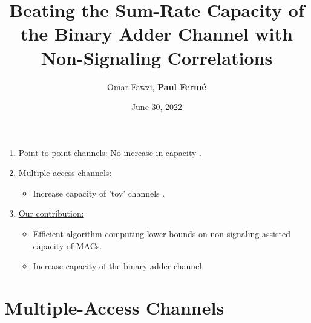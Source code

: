 \documentclass{beamer}
\title{Beating the Sum-Rate Capacity of the Binary Adder Channel with Non-Signaling Correlations}
\author{Omar Fawzi, \textbf{Paul Fermé}}
\institute{\href{https://arxiv.org/abs/2206.10968}{arXiv:2206.10968}}
\date{June 30, 2022}
\theoremstyle{definition}
\theoremstyle{remark}
\begin{document}

\begin{frame}
  \titlepage
\end{frame}

\begin{frame}
  \pause
  \bigskip
  \begin{enumerate}
  \item \underline{Point-to-point channels:} No increase in capacity \cite{BSST99,Matthews12,BF18}.
    \pause
    \bigskip
  \item \underline{Multiple-access channels:}
    \begin{itemize}
      \item Increase capacity of 'toy' channels \cite{LALS20}.
    \pause
    \bigskip
    \end{itemize}
  \item \underline{Our contribution:}
    \begin{itemize}
    \item Efficient algorithm computing lower bounds on non-signaling assisted capacity of MACs.
    \item Increase capacity of the binary adder channel.
    \end{itemize}
  \end{enumerate}
\end{frame}

\section{Multiple-Access Channels}
%    
%
%
\end{document}
